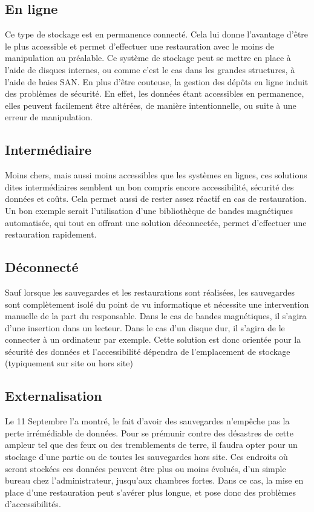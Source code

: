 \documentclass[a4paper,11pt]{report}
\begin{document}
\subsection{En ligne}
Ce type de stockage est en permanence connecté. Cela lui donne l'avantage d'être le plus accessible et permet d'effectuer une restauration avec le moins de manipulation au préalable.
Ce système de stockage peut se mettre en place à l'aide de disques internes, ou comme c'est le cas dans les grandes structures, à l'aide de baies SAN.
En plus d'être couteuse, la gestion des dépôts en ligne induit des problèmes de sécurité. En effet, les données étant accessibles en permanence, elles peuvent facilement être altérées, de manière intentionnelle, ou suite à une erreur de manipulation.

\subsection{Intermédiaire}
Moins chers, mais aussi moins accessibles que les systèmes en lignes, ces solutions dites intermédiaires semblent un bon compris encore accessibilité, sécurité des données et coûts.
Cela permet aussi de rester assez réactif en cas de restauration.
Un bon exemple serait l'utilisation d'une bibliothèque de bandes magnétiques automatisée, qui tout en offrant une solution déconnectée, permet d'effectuer une restauration rapidement.

\subsection{Déconnecté}
Sauf lorsque les sauvegardes et les restaurations sont réalisées, les sauvegardes sont complètement isolé du point de vu informatique et nécessite une intervention manuelle de la part du responsable.
Dans le cas de bandes magnétiques, il s'agira d'une insertion dans un lecteur. Dans le cas d'un disque dur, il s'agira de le connecter à un ordinateur par exemple.
Cette solution est donc orientée pour la sécurité des données et l'accessibilité dépendra de l'emplacement de stockage (typiquement sur site ou hors site) 

\subsection{Externalisation}
Le 11 Septembre l'a montré, le fait d'avoir des sauvegardes n'empêche pas la perte irrémédiable de données.
Pour se prémunir contre des désastres de cette ampleur tel que des feux ou des tremblements de terre, il faudra opter pour un stockage d'une partie ou de toutes les sauvegardes hors site.
Ces endroits où seront stockées ces données peuvent être plus ou moins évolués, d'un simple bureau chez l'administrateur, jusqu'aux chambres fortes.
Dans ce cas, la mise en place d'une restauration peut s'avérer plus longue, et pose donc des problèmes d'accessibilités.
\end{document}
